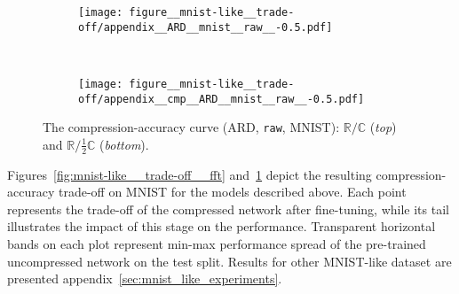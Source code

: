 \documentclass{article}
\newcommand{\real}{\mathbb{R}}
\newcommand{\cplx}{\mathbb{C}}
\begin{document}
\begin{figure}[!t]
  \centering
  \begin{subfigure}  %
    \centering
    \texttt{[image: figure\_\_mnist-like\_\_trade-off/appendix\_\_ARD\_\_mnist\_\_raw\_\_-0.5.pdf]}
  \end{subfigure} \\%
  \begin{subfigure}  %
    \centering
    \texttt{[image: figure\_\_mnist-like\_\_trade-off/appendix\_\_cmp\_\_ARD\_\_mnist\_\_raw\_\_-0.5.pdf]}
  \end{subfigure}
  \caption{%
    The compression-accuracy curve (ARD, \texttt{raw}, MNIST):
    $\real / \cplx$ (\textit{top}) and $\real / \tfrac12 \cplx$ (\textit{bottom}).
  }
  \label{fig:mnist-like__trade-off__raw}
\end{figure}

Figures~\ref{fig:mnist-like__trade-off__fft} and~\ref{fig:mnist-like__trade-off__raw}
depict the resulting compression-accuracy trade-off on MNIST for the models described
above.
%
Each point represents the trade-off of the compressed network after fine-tuning, while
its tail illustrates the impact of this stage on the performance. Transparent horizontal
bands on each plot represent min-max performance spread of the pre-trained uncompressed
network on the test split.
%
Results for other MNIST-like dataset are presented appendix~\ref{sec:mnist_like_experiments}.
\end{document}
